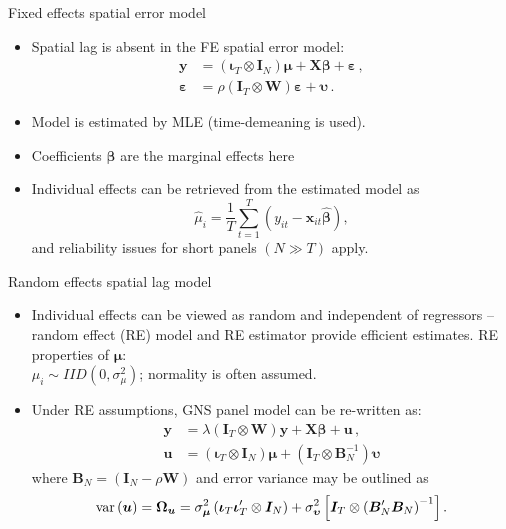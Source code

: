 \documentclass{beamer}
\newcommand{\Ms}[2]{\bm{#1}_{#2}}
\begin{document}
\begin{frame}{Fixed effects spatial error model}
\begin{itemize}
    \item Spatial lag is absent in the FE spatial error model:
    \begin{equation*}
    \begin{aligned}
      \bm{y}  &= 
      \left( \Ms{\iota}{T} \otimes \Ms{I}{N} \right) \bm{\mu} + \bm{X\beta} + \bm{\varepsilon}\,, \\
      \bm{\varepsilon} &= \rho
      \left( \Ms{I}{T} \otimes \bm{W} \right) \bm{\varepsilon} + \bm{\upsilon}\,.
    \end{aligned}
    \end{equation*}
    \item Model is estimated by MLE (time-demeaning is used).
    \smallskip
    \item Coefficients $\bm{\beta}$ are the marginal effects here
    \smallskip
    \item Individual effects can be retrieved from the estimated model as 
\begin{equation*} 
\hat{\mu}_i =
\frac{1}{T} \sum_{t=1}^T \left( y_{it} - \bm{x}_{it} \bm{\hat{\beta}} \right),
\end{equation*}
and reliability issues for short panels $(N \gg T)$ apply.
\end{itemize}
\end{frame}
\begin{frame}{Random effects spatial lag model}
\begin{itemize}
    \item Individual effects can be viewed as random and independent of regressors -- random effect (RE) model and RE estimator provide efficient estimates. RE properties of $\bm{\mu}$: \\$\mu_i \sim \textit{IID} \left( 0,\sigma_{\mu}^2 \right)$; normality is often assumed.
    \medskip
    \item Under RE assumptions, GNS panel model can be re-written as:
    \begin{equation*} 
     \begin{aligned}
      \bm{y}  &= 
      \lambda \left( \Ms{I}{T} \otimes \bm{W} \right) \bm{y} + \bm{X\beta} + \bm{u}\,, \\
      \bm{u} &= 
      \left( \Ms{\iota}{T} \otimes \Ms{I}{N} \right) \bm{\mu} + 
      \left( \Ms{I}{T} \otimes \Ms{B}{N}^{-1} \right) \bm{\upsilon}
     \end{aligned}
    \end{equation*}
    where $\Ms{B}{N}= \left( \Ms{I}{N} - \rho \bm{W} \right)$ and error variance may be outlined as
    \begin{equation*}
  \textnormal{var} \left( \bm{u} \right) = \bm{\Omega}_{\bm{u}} =
  \sigma_{\bm{\mu}}^2 \left( \Ms{\iota}{T} \Ms{\iota}{T}^\prime \otimes \Ms{I}{N} \right) 
  + \sigma_{\bm{\upsilon}}^2 \left[ \Ms{I}{T} \otimes \left( \Ms{B}{N}^\prime \Ms{B}{N} \right)^{-1} \right].
\end{equation*}
\end{itemize}
\end{frame}
\end{document}
